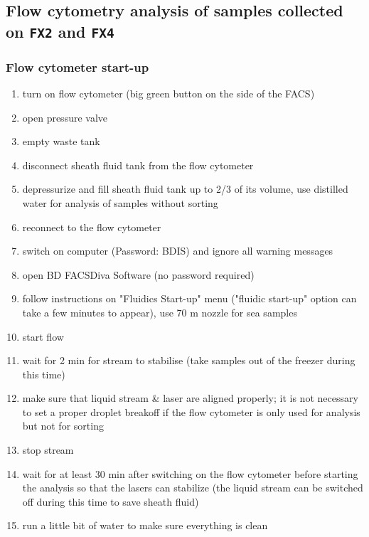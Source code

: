 \subsection{Flow cytometry analysis of samples collected on \texttt{FX2} and \texttt{FX4}}
\label{task:20180106_cj1}

\subsubsection{Flow cytometer start-up}

\begin{enumerate}
\item turn on flow cytometer (big green button on the side of the FACS)
\item open pressure valve
\item empty waste tank
\item disconnect sheath fluid tank from the flow cytometer
\item depressurize and fill sheath fluid tank up to 2/3 of its volume, use distilled water for analysis of samples without sorting
\item reconnect to the flow cytometer
\item switch on computer (Password: BDIS) and ignore all warning messages
\item open BD FACSDiva Software (no password required)
\item follow instructions on "Fluidics Start-up" menu ("fluidic start-up" option can take a few minutes to appear), use 70 \textmu m nozzle for sea samples
\item start flow
\item wait for 2 min for stream to stabilise (take samples out of the freezer during this time)
\item make sure that liquid stream \& laser are aligned properly; it is not necessary to set a proper droplet breakoff if the flow cytometer is only used for analysis but not for sorting
\item stop stream
\item wait for at least 30 min after switching on the flow cytometer before starting the analysis so that the lasers can stabilize (the liquid stream can be switched off during this time to save sheath fluid)
\item run a little bit of water to make sure everything is clean
\end{enumerate}


